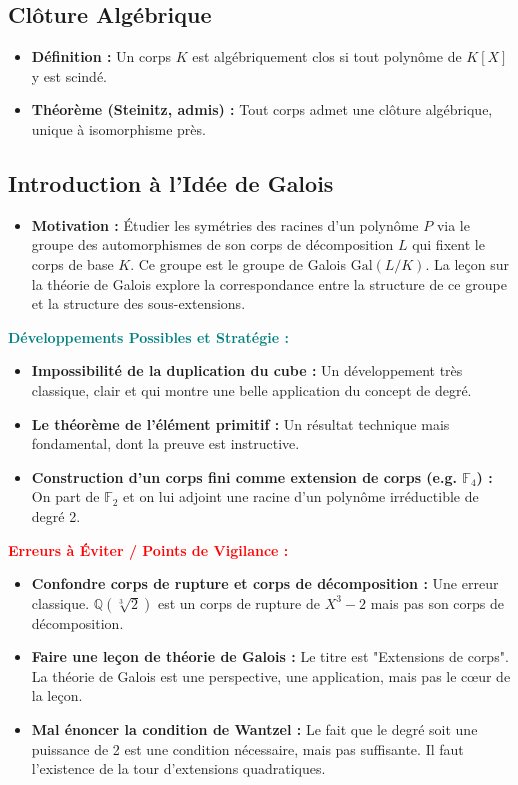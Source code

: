 \documentclass[12pt, a4paper, parskip=full]{report}
\theoremstyle{agregstyle}
\newenvironment{developpements}
  {\par\medskip\noindent\begin{oframed}\noindent\textbf{\textcolor{teal}{Développements Possibles et Stratégie :}}}
  {\end{oframed}\par\medskip}
\newenvironment{erreurs}
  {\par\medskip\noindent\begin{oframed}\noindent\textbf{\textcolor{red}{Erreurs à Éviter / Points de Vigilance :}}}
  {\end{oframed}\par\medskip}
\begin{document}
\subsection{Clôture Algébrique}
\begin{itemize}
    \item \textbf{Définition :} Un corps $K$ est algébriquement clos si tout polynôme de $K[X]$ y est scindé.
    \item \textbf{Théorème (Steinitz, admis) :} Tout corps admet une clôture algébrique, unique à isomorphisme près.
\end{itemize}
\subsection{Introduction à l'Idée de Galois}
\begin{itemize}
    \item \textbf{Motivation :} Étudier les symétries des racines d'un polynôme $P$ via le groupe des automorphismes de son corps de décomposition $L$ qui fixent le corps de base $K$. Ce groupe est le groupe de Galois $\mathrm{Gal}(L/K)$. La leçon sur la théorie de Galois explore la correspondance entre la structure de ce groupe et la structure des sous-extensions.
\end{itemize}

\begin{developpements}
    \begin{itemize}
        \item \textbf{Impossibilité de la duplication du cube :} Un développement très classique, clair et qui montre une belle application du concept de degré.
        \item \textbf{Le théorème de l'élément primitif :} Un résultat technique mais fondamental, dont la preuve est instructive.
        \item \textbf{Construction d'un corps fini comme extension de corps (e.g. $\mathbb{F}_4$) :} On part de $\mathbb{F}_2$ et on lui adjoint une racine d'un polynôme irréductible de degré 2.
    \end{itemize}
\end{developpements}

\begin{erreurs}
    \begin{itemize}
        \item \textbf{Confondre corps de rupture et corps de décomposition :} Une erreur classique. $\mathbb{Q}(\sqrt[3]{2})$ est un corps de rupture de $X^3-2$ mais pas son corps de décomposition.
        \item \textbf{Faire une leçon de théorie de Galois :} Le titre est "Extensions de corps". La théorie de Galois est une perspective, une application, mais pas le cœur de la leçon.
        \item \textbf{Mal énoncer la condition de Wantzel :} Le fait que le degré soit une puissance de 2 est une condition nécessaire, mais pas suffisante. Il faut l'existence de la tour d'extensions quadratiques.
    \end{itemize}
\end{erreurs}
\end{document}
